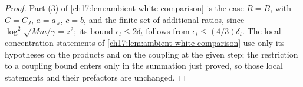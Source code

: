 \begin{proof}
Part (3) of \cref{ch17:lem:ambient-white-comparison} is the case $R=B$, with $C=C_J$, $a=a_{\mathrm w}$, $c=b$, and the finite set of additional ratios, since $\log^2\sqrt{Mm/\gamma}=z^2$; its bound $\epsilon_t\le2\delta_t$ follows from $\epsilon_t\le(4/3)\delta_t$. The local concentration statements of \cref{ch17:lem:ambient-white-comparison} use only its hypotheses on the products and on the coupling at the given step; the restriction to a coupling bound enters only in the summation just proved, so those local statements and their prefactors are unchanged.
\end{proof}
